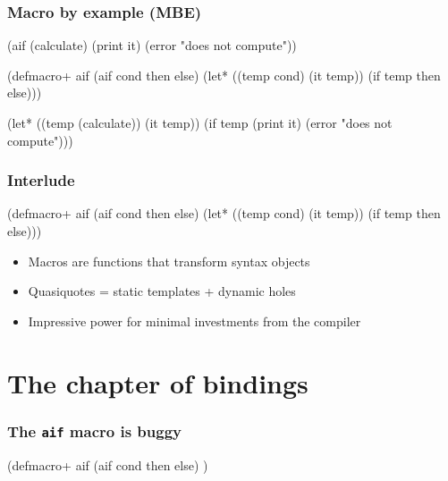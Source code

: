 \documentclass[hyperref={bookmarks=false}]{beamer}
\begin{document}
\begin{frame}[fragile]
\frametitle{Macro by example (MBE)}
\begin{semiverbatim}
(aif (calculate)
  (print it)
  (error "does not compute"))

(defmacro+ aif
  \alert{(aif cond then else)}
  (let* ((temp \alert{cond})
         (it temp))
    (if temp
        \alert{then}
        \alert{else})))

(let* ((temp (calculate))
       (it temp))
  (if temp
    (print it)
    (error "does not compute")))
\end{semiverbatim}
\end{frame}

\begin{frame}[fragile]
\frametitle{Interlude}

\begin{semiverbatim}
(defmacro+ aif
  (aif cond then else)
  (let* ((temp cond)
         (it temp))
    (if temp then else)))
\end{semiverbatim}

\vskip50pt

\begin{itemize}
\item Macros are functions that transform syntax objects
\item Quasiquotes = static templates + dynamic holes
\item Impressive power for minimal investments from the compiler
\end{itemize}
\end{frame}

\section{The chapter of bindings}

\begin{frame}[fragile]
\frametitle{The \texttt{aif} macro is buggy}
\begin{semiverbatim}
\text{\color{blue}{(aif (calculate)}}
  \text{\color{blue}{(print it)}}
  \text{\color{blue}{(error "does not compute"))}}

(defmacro+ aif
  (aif cond then else)
  \text{\color{red}{(let* ((temp cond)}}
         \text{\color{red}{(it temp))}}
    \text{\color{red}{(if temp then else))}})

\end{semiverbatim}
\end{frame}
\end{document}

